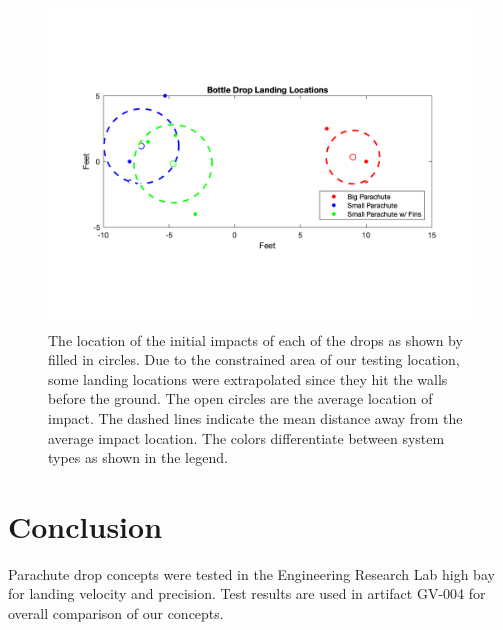 \documentclass[]{auvsi_doc}
\begin{document}
\begin{figure}[h!]
\includegraphics[width=\columnwidth]{LandingLocations.png}
\caption{The location of the initial impacts of each of the drops as shown by filled in circles. Due to the constrained area of our testing location, some landing locations were extrapolated since they hit the walls before the ground. The open circles are the average location of impact. The dashed lines indicate the mean distance away from the average impact location. The colors differentiate between system types as shown in the legend.}
\label{fig:locations}
\end{figure}

\section{Conclusion}
Parachute drop concepts were tested in the Engineering Research Lab high bay for landing velocity and precision. Test results are used in artifact GV-004 for overall comparison of our concepts.
\end{document}
